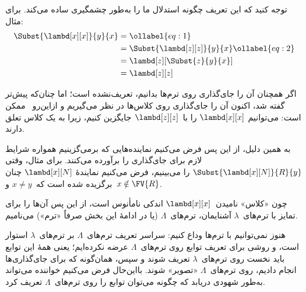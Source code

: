 \documentclass[../../../include/open-logic-section]{subfiles}
\begin{document}
توجه کنید که این تعریف چگونه استدلال ما را به‌طور چشمگیری ساده می‌کند.
برای مثال:
\begin{align}
  \Subst{\lambd[x][x]}{y}{x} & =\ollabel{eq:1}\\
  &= \Subst{\lambd[z][z]}{y}{x} \ollabel{eq:2}\\
  &= \lambd[z][\Subst{z}{y}{x}] \\
  &= \lambd[z][z]
\end{align}

اگر همچنان آن را جای‌گذاری روی ترم‌ها بدانیم،  تعریف‌نشده
است؛ اما چنان‌که پیش‌تر گفته شد، اکنون آن را جای‌گذاری روی کلاس‌ها در
نظر می‌گیریم و ازاین‌رو~ ممکن است: می‌توانیم
$\lambd[x][x]$ را با~$\lambd[z][z]$ جایگزین کنیم، زیرا به یک کلاس تعلق
دارند.

به همین دلیل، از این پس فرض می‌کنیم نماینده‌هایی که برمی‌گزینیم همواره
شرایط لازم برای جای‌گذاری را برآورده می‌کنند. برای مثال، وقتی
$\Subst{\lambd[x][N]}{R}{y}$ را می‌بینیم، فرض می‌کنیم نمایندهٔ
$\lambd[x][N]$ چنان برگزیده شده است که~$x \neq y$ و~$x \notin
\FV{R}$.

چون «کلاس» نامیدن~$\lambd[x][x]$ اندکی نامأنوس است، از این پس آن‌ها را
برای تمایز با ترم‌های~$\lambda$ آشنایمان، ترم‌های~$\Lambda$ (یا در
ادامهٔ این بخش صرفاً «ترم») می‌نامیم.

\begin{editorial}
  هنوز نمی‌توانیم با ترم‌ها وداع کنیم: سراسر تعریف ترم‌های~$\Lambda$
  بر ترم‌های~$\lambda$ استوار است، و روشی برای تعریف توابع روی
  ترم‌های~$\Lambda$ عرضه نکرده‌ایم؛ یعنی همهٔ این توابع باید نخست روی
  ترم‌های~$\lambda$ تعریف شوند و سپس، همان‌گونه که برای جای‌گذاری‌ها
  انجام دادیم، روی ترم‌های~$\Lambda$ «تصویر» شوند. بااین‌حال فرض می‌کنیم
  خواننده می‌تواند به‌طور شهودی دریابد که چگونه می‌توان توابع را روی
  ترم‌های~$\Lambda$ تعریف کرد.
\end{editorial}
\end{document}
